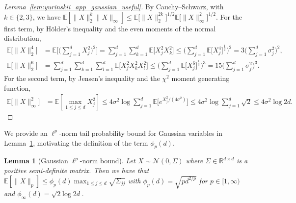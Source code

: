 \documentclass[11pt,lof]{puthesis}
\newcommand{\R}{\ensuremath{\mathbb{R}}}
\newcommand{\E}{\ensuremath{\mathbb{E}}}
\newcommand{\cN}{\ensuremath{\mathcal{N}}}
\theoremstyle{break}
\newtheorem{lemma}{Lemma}[section]
\theoremstyle{proof}
\newtheorem{proof}{Proof}
\begin{document}
\begin{proof}[Lemma~\ref{lem:yurinskii_app_gaussian_useful}]

  By Cauchy--Schwarz, with $k \in \{2,3\}$, we have
  $\E\left[\|X\|_2^{k} \|X\|_\infty \right]
  \leq \E\big[\|X\|_2^{2k} \big]^{1/2} \E\big[\|X\|_\infty^2 \big]^{1/2}$.
  For the first term, by H{\"o}lder's inequality and the even
  moments of the normal distribution,
  \begin{align*}
    \E\big[\|X\|_2^4 \big]
    &=
    \E\Bigg[
      \bigg(
        \sum_{j=1}^d X_j^2
      \bigg)^2
    \Bigg]
    =
    \sum_{j=1}^d \sum_{k=1}^d
    \E\big[
      X_j^2 X_k^2
    \big]
    \leq
    \bigg(
      \sum_{j=1}^d
      \E\big[X_j^4 \big]^{\frac{1}{2}}
    \bigg)^2
    =
    3 \bigg(
      \sum_{j=1}^d
      \sigma_j^2
    \bigg)^2, \\
    \E\big[\|X\|_2^6 \big]
    &=
    \sum_{j=1}^d \sum_{k=1}^d \sum_{l=1}^d
    \E\big[
      X_j^2 X_k^2 X_l^2
    \big]
    \leq
    \bigg(
      \sum_{j=1}^d
      \E\big[X_j^6 \big]^{\frac{1}{3}}
    \bigg)^3
    =
    15 \bigg(
      \sum_{j=1}^d
      \sigma_j^2
    \bigg)^3.
  \end{align*}
  For the second term, by Jensen's inequality and the $\chi^2$ moment
  generating function,
  \begin{align*}
    \E\big[\|X\|_\infty^2 \big]
    &=
    \E\left[
      \max_{1 \leq j \leq d}
      X_j^2
    \right]
    \leq
    4 \sigma^2
    \log
    \sum_{j=1}^d
    \E\Big[
      e^{X_j^2 / (4\sigma^2)}
    \Big]
    \leq
    4 \sigma^2
    \log
    \sum_{j=1}^d
    \sqrt{2}
    \leq
    4 \sigma^2
    \log 2 d.
  \end{align*}
\end{proof}

We provide an $\ell^p$-norm tail probability bound for Gaussian variables in
Lemma~\ref{lem:yurinskii_app_gaussian_pnorm}, motivating the definition of the
term $\phi_p(d)$.

\begin{lemma}[Gaussian \texorpdfstring{$\ell^p$}{lp}-norm bound]%
  \label{lem:yurinskii_app_gaussian_pnorm}
  Let $X \sim \cN(0, \Sigma)$ where $\Sigma \in \R^{d \times d}$
  is a positive semi-definite matrix. Then we have that
  $\E\left[ \|X\|_p \right] \leq
  \phi_p(d) \max_{1 \leq j \leq d} \sqrt{\Sigma_{j j}}$
  with $\phi_p(d) = \sqrt{pd^{2/p} }$ for $p \in [1,\infty)$
  and $\phi_\infty(d) = \sqrt{2\log 2d}$.
\end{lemma}
\end{document}
